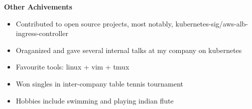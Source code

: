 \documentclass[letterpaper,11pt]{article}
\newcommand{\resitem}[1]{\item #1 \vspace{-2pt}}
\newcommand{\resheading}[1]{{\large \colorbox{mygrey}{\begin{minipage}{\textwidth}{\textbf{#1 \vphantom{p\^{E}}}}\end{minipage}}}}
\begin{document}
\resheading{Other Achivements}

\begin{itemize}
    \resitem{\footnotesize Contributed to open source projects, most notably, kubernetes-sig/aws-alb-ingress-controller}
    \resitem{\footnotesize Oraganized and gave several internal talks at my company on kubernetes}
    \resitem{\footnotesize Favourite tools: linux + vim + tmux}
    \resitem{\footnotesize Won singles in inter-company table tennis tournament}
    \resitem{\footnotesize Hobbies include swimming and playing indian flute}
\end{itemize}
\end{document}
